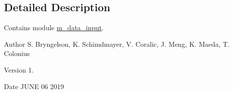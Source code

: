 \subsection{Detailed Description}
Contains module \hyperlink{namespacem__data__input}{m\+\_\+data\+\_\+input}. 

\begin{DoxyAuthor}{Author}
S. Bryngelson, K. Schimdmayer, V. Coralic, J. Meng, K. Maeda, T. Colonius 
\end{DoxyAuthor}
\begin{DoxyVersion}{Version}
1. 
\end{DoxyVersion}
\begin{DoxyDate}{Date}
J\+U\+NE 06 2019 
\end{DoxyDate}
